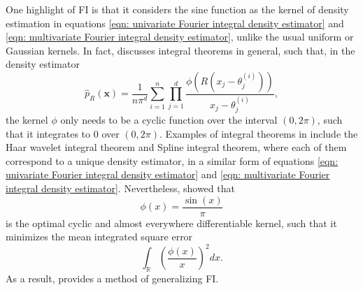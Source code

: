 \documentclass[%
 reprint,
 amsmath,amssymb,
 aps,
]{revtex4-2}
\def\R{\mathbb{R}}
\begin{document}
One highlight of FI is that it considers the sine function as the kernel of density estimation in equations \eqref{eqn: univariate Fourier integral density estimator} and \eqref{eqn: multivariate Fourier integral density estimator}, unlike the usual uniform or Gaussian kernels. In fact, \cite{ho2021integral} discusses integral theorems in general, such that, in the density estimator
\begin{equation} \label{eqn: general integral theorem estimator}
    \hat{p}_R(\mathbf{x}) = \frac{1}{n\pi^d}\sum_{i = 1}^n \prod_{j = 1}^d \frac{\phi(R(x_j - \theta_j^{(i)}))}{x_j - \theta_j^{(i)}},
\end{equation}
the kernel $\phi$ only needs to be a cyclic function over the interval $(0, 2\pi)$, such that it integrates to 0 over $(0, 2\pi)$. Examples of integral theorems in \cite{ho2021integral} include the Haar wavelet integral theorem and Spline integral theorem, where each of them correspond to a unique density estimator, in a similar form of equations \eqref{eqn: univariate Fourier integral density estimator} and \eqref{eqn: multivariate Fourier integral density estimator}. Nevertheless, \cite{ho2021integral} showed that 
\begin{equation} \label{eqn: optimal cyclic kernel (sine)}
    \phi(x) = \frac{\sin(x)}{\pi}
\end{equation}
is the optimal cyclic and almost everywhere differentiable kernel, such that it minimizes the mean integrated square error
\begin{equation} \label{eqn: mean integrated square error}
    \int_\R \left(\frac{\phi(x)}{x} \right)^2dx.
\end{equation}
As a result, \cite{ho2021integral} provides a method of generalizing FI.
\end{document}
